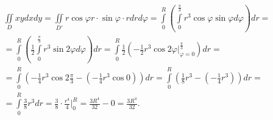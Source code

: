 \begin{align*}
&\iint\limits_D x y d x d y = \iint\limits_{D'} r \cos \varphi r \cdot \sin \varphi \cdot r d r d \varphi = \int\limits_{0}^{R}\left(\int\limits_{0}^{\frac{\pi}{3}}r^3 \cos \varphi \sin \varphi d \varphi\right) d r =&\\
&= \int\limits_{0}^{R}\left(\frac{1}{2}\int\limits_{0}^{\frac{\pi}{3}}r^3 \sin 2 \varphi d \varphi\right) d r = \int\limits_{0}^{R}\frac{1}{2}\left(-\frac{1}{2}r^3 \cos 2 \varphi \biggr|_{\varphi = 0}^{\frac{\pi}{3}} \right) d r = &\\
&= \int\limits_{0}^{R}\left(-\frac{1}{4}r^3 \cos 2 \frac{\pi}{3} - \left(-\frac{1}{4}r^3 \cos 0\right) \right) d r = \int\limits_{0}^{R}\left(\frac{1}{8}r^3 - \left(-\frac{1}{4}r^3 \right) \right) d r = &\\
& = \int\limits_{0}^{R}\frac{3}{8}r^3 d r = \frac{3}{8}\cdot\frac{r^4}{4}\biggr|_{0}^{R} = \frac{3 R^4}{32} - 0 = \frac{3 R^4}{32}.&
\end{align*}
